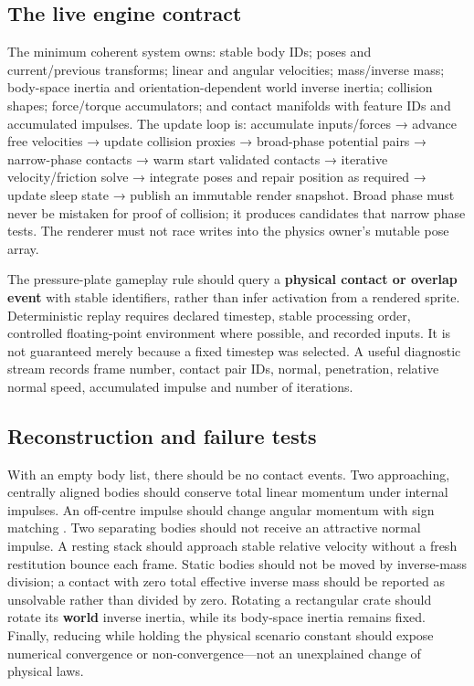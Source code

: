 \subsection{The live engine contract}\label{02-foundations-ii-ch039-the-live-engine-contract}

\hypertarget{02-foundations-ii-ch039-the-live-engine-contract}{}

The minimum coherent system owns: stable body IDs; poses and current/previous transforms; linear and angular velocities; mass/inverse mass; body-space inertia and orientation-dependent world inverse inertia; collision shapes; force/torque accumulators; and contact manifolds with feature IDs and accumulated impulses. The update loop is: accumulate inputs/forces → advance free velocities → update collision proxies → broad-phase potential pairs → narrow-phase contacts → warm start validated contacts → iterative velocity/friction solve → integrate poses and repair position as required → update sleep state → publish an immutable render snapshot. Broad phase must never be mistaken for proof of collision; it produces candidates that narrow phase tests. The renderer must not race writes into the physics owner's mutable pose array.

The pressure-plate gameplay rule should query a \textbf{physical contact or overlap event} with stable identifiers, rather than infer activation from a rendered sprite. Deterministic replay requires declared timestep, stable processing order, controlled floating-point environment where possible, and recorded inputs. It is not guaranteed merely because a fixed timestep was selected. A useful diagnostic stream records frame number, contact pair IDs, normal, penetration, relative normal speed, accumulated impulse and number of iterations.

\subsection{Reconstruction and failure tests}\label{02-foundations-ii-ch039-reconstruction-and-failure-tests}

\hypertarget{02-foundations-ii-ch039-reconstruction-and-failure-tests}{}

With an empty body list, there should be no contact events. Two approaching, centrally aligned bodies should conserve total linear momentum under internal impulses. An off-centre impulse should change angular momentum with sign matching . Two separating bodies should not receive an attractive normal impulse. A resting stack should approach stable relative velocity without a fresh restitution bounce each frame. Static bodies should not be moved by inverse-mass division; a contact with zero total effective inverse mass should be reported as unsolvable rather than divided by zero. Rotating a rectangular crate should rotate its \textbf{world} inverse inertia, while its body-space inertia remains fixed. Finally, reducing  while holding the physical scenario constant should expose numerical convergence or non-convergence---not an unexplained change of physical laws.

